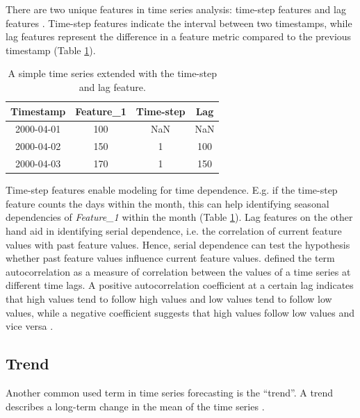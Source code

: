 There are two unique features in time series analysis: time-step features and lag features \parencite{haben2023time}. Time-step features indicate the interval between two timestamps, while lag features represent the difference in a feature metric compared to the previous timestamp (Table \ref{tab:time_series_extended}).


\begin{table}[h]
   \centering
    \begin{tabular}{|c|c|c|c|}
        \hline
         \textbf{Timestamp}&  \textbf{Feature\_1}&  \textbf{Time-step}& \textbf{Lag}\\
         \hline
         2000-04-01&  100&  NaN& NaN\\
         \hline
         2000-04-02&  150&  1& 100\\
         \hline
         2000-04-03&  170&  1& 150\\
         \hline
    \end{tabular}
    \caption{A simple time series extended with the time-step and lag feature.}
    \label{tab:time_series_extended}
\end{table}

Time-step features enable modeling for time dependence. E.g. if the time-step feature counts the days within the month, this can help identifying seasonal dependencies of \textit{Feature\_1} within the month (Table \ref{tab:time_series_extended}). Lag features on the other hand aid in identifying serial dependence, i.e. the correlation of current feature values with past feature values. Hence, serial dependence can test the hypothesis whether past feature values influence current feature values. \textcite{box2015time} defined the term autocorrelation as a measure of correlation between the values of a time series at different time lags. A positive autocorrelation coefficient at a certain lag indicates that high values tend to follow high values and low values tend to follow low values, while a negative coefficient suggests that high values follow low values and vice versa \parencite[ch. 2]{box2015time}.

\subsection{Trend}
Another common used term in time series forecasting is the ``trend''. A trend describes a long-term change in the mean of the time series \parencite[ch. 5]{haben2023time}. 

